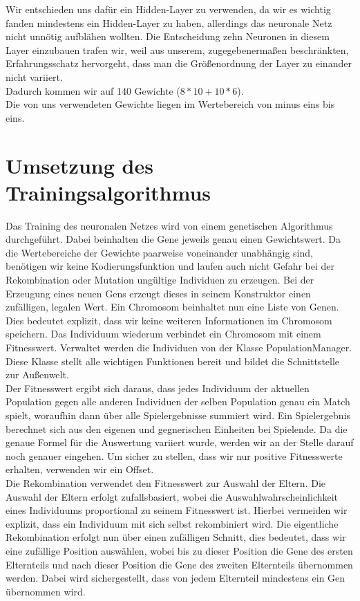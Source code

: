 \documentclass[
	12pt,
	a4paper,
	BCOR10mm,
	DIV14,
	headsepline,
	usegeometry,
]{scrreprt}
\begin{document}
Wir entschieden uns dafür ein Hidden-Layer zu verwenden, da wir es wichtig fanden mindestens ein Hidden-Layer zu haben, allerdings das neuronale Netz nicht unnötig aufblähen wollten. Die Entscheidung zehn Neuronen in diesem Layer einzubauen trafen wir, weil aus unserem, zugegebenermaßen beschränkten, Erfahrungsschatz hervorgeht, dass man die Größenordnung der Layer zu einander nicht variiert.\\
Dadurch kommen wir auf 140 Gewichte ($8 * 10 + 10 * 6$).\\
Die von uns verwendeten Gewichte liegen im Wertebereich von minus eins bis eins.

\section{Umsetzung des Trainingsalgorithmus}
Das Training des neuronalen Netzes wird von einem genetischen Algorithmus durchgeführt. Dabei beinhalten die Gene jeweils genau einen Gewichtswert. Da die Wertebereiche der Gewichte paarweise voneinander unabhängig sind, benötigen wir keine Kodierungsfunktion und laufen auch nicht Gefahr bei der Rekombination oder Mutation ungültige Individuen zu erzeugen. Bei der Erzeugung eines neuen Gens erzeugt dieses in seinem Konstruktor einen zufälligen, legalen Wert. Ein Chromosom beinhaltet nun eine Liste von Genen. Dies bedeutet explizit, dass wir keine weiteren Informationen im Chromosom speichern. Das Individuum wiederum verbindet ein Chromosom mit einem Fitnesswert. Verwaltet werden die Individuen von der Klasse PopulationManager. Diese Klasse stellt alle wichtigen Funktionen bereit und bildet die Schnittstelle zur Außenwelt.\\
Der Fitnesswert ergibt sich daraus, dass jedes Individuum der aktuellen Population gegen alle anderen Individuen der selben Population genau ein Match spielt, woraufhin dann über alle Spielergebnisse summiert wird. Ein Spielergebnis berechnet sich aus den eigenen und gegnerischen Einheiten bei Spielende. Da die genaue Formel für die Auswertung variiert wurde, werden wir an der Stelle darauf noch genauer eingehen. Um sicher zu stellen, dass wir nur positive Fitnesswerte erhalten, verwenden wir ein Offset.\\
Die Rekombination verwendet den Fitnesswert zur Auswahl der Eltern. Die Auswahl der Eltern erfolgt zufallsbasiert, wobei die Auswahlwahrscheinlichkeit eines Individuums proportional zu seinem Fitnesswert ist. Hierbei vermeiden wir explizit, dass ein Individuum mit sich selbst rekombiniert wird. Die eigentliche Rekombination erfolgt nun über einen zufälligen Schnitt, dies bedeutet, dass wir eine zufällige Position auswählen, wobei bis zu dieser Position die Gene des ersten Elternteils und nach dieser Position die Gene des zweiten Elternteils übernommen werden. Dabei wird sichergestellt, dass von jedem Elternteil mindestens ein Gen übernommen wird.\\
\end{document}
